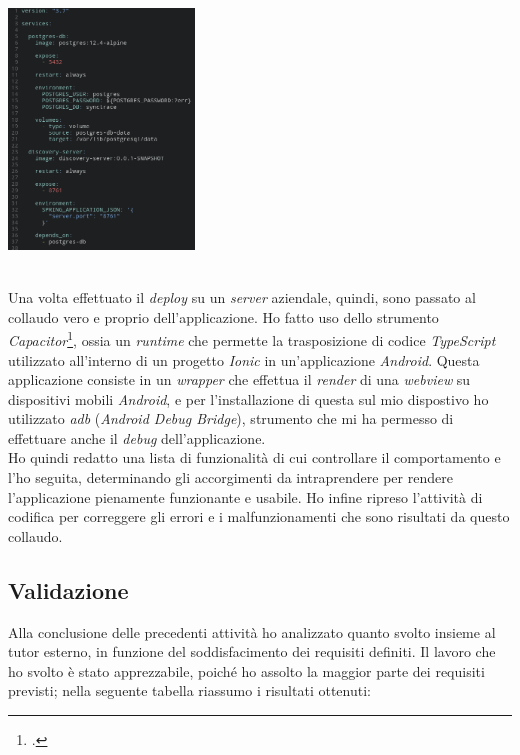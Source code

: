 \begin{minipage}{\linewidth}
  \centering
    \includegraphics[height=6.4cm]{immagini/dockeryml}
\end{minipage} \\

Una volta effettuato il \textit{deploy} su un \textit{server} aziendale, quindi, sono passato al collaudo vero e proprio dell'applicazione. Ho fatto uso dello strumento \textit{Capacitor}\footcite{tec:capacitor}, ossia un \textit{runtime} che permette la trasposizione di codice \textit{TypeScript} utilizzato all'interno di un progetto \textit{Ionic} in un'applicazione \textit{Android}. Questa applicazione consiste in un \textit{wrapper} che effettua il \textit{render} di una \textit{webview} su dispositivi mobili \textit{Android}, e per l'installazione di questa sul mio dispostivo ho utilizzato \textit{adb} (\textit{Android Debug Bridge}), strumento che mi ha permesso di effettuare anche il \textit{debug} dell'applicazione. \\
Ho quindi redatto una lista di funzionalità di cui controllare il comportamento e l'ho seguita, determinando gli accorgimenti da intraprendere per rendere l'applicazione pienamente funzionante e usabile. Ho infine ripreso l'attività di codifica per correggere gli errori e i malfunzionamenti che sono risultati da questo collaudo.

\subsection*{Validazione}

Alla conclusione delle precedenti attività ho analizzato quanto svolto insieme al tutor esterno, in funzione del soddisfacimento dei requisiti definiti. Il lavoro che ho svolto è stato apprezzabile, poiché ho assolto la maggior parte dei requisiti previsti; nella seguente tabella riassumo i risultati ottenuti:


